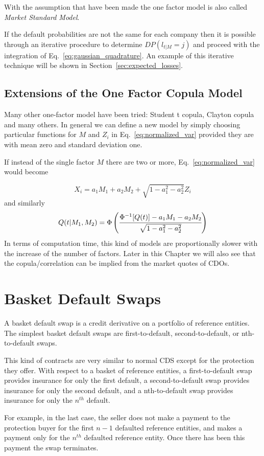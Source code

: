 With the assumption that have been made the one factor model is also called \emph{Market Standard Model}.

If the default probabilities are not the same for each company then it is possible through an iterative procedure to determine $DP(l_{t|M}=j)$ and proceed with the integration of Eq.~\ref{eq:gaussian_quadrature}.
An example of this iterative technique will be shown in Section~\ref{sec:expected_losses}.

\subsection{Extensions of the One Factor Copula Model}
Many other one-factor model have been tried: Student t copula, Clayton copula and many others. In general we can define a new model by simply choosing particular functions for $M$ and $Z_i$ in Eq.~\ref{eq:normalized_var} provided they are with mean zero and standard deviation one. 

If instead of the single factor $M$ there are two or more, Eq.~\ref{eq:normalized_var} would become

\[
X_i = a_1 M_1 + a_2 M_2 + \sqrt{1 - a_1^2 - a^2_2}Z_i
\]
and similarly
\[
Q(t|M_1, M_2) = \Phi\left(\cfrac{\Phi^{-1}[Q(t)]-a_1 M_1 - a_2 M_2}{\sqrt{1 - a_1^2 - a^2_2}}\right)
\]
In terms of computation time, this kind of models are proportionally slower with the increase of the number of factors.
Later in this Chapter we will also see that the copula/correlation can be implied from the market quotes of CDOs.

\section{Basket Default Swaps}\label{basket-default-swaps}

A basket default swap is a credit derivative on a portfolio of reference
entities. The simplest basket default swaps are first-to-default,
second-to-default, or nth-to-default swaps. 

This kind of contracts are very similar to normal CDS except for the protection they offer.
With respect to a basket of reference entities, a first-to-default swap provides insurance for only the first default, a second-to-default swap provides insurance
for only the second default, and a nth-to-default swap provides insurance for only the $n^{th}$ default. 

For example, in the last case, the
seller does not make a payment to the protection buyer for
the first $n-1$ defaulted reference entities, and makes a payment only for the
$n^{th}$ defaulted reference entity. Once there has been this payment the swap terminates.

